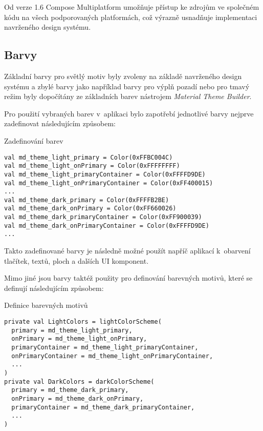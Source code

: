 Od verze 1.6 Compose Multiplatform umožňuje přístup ke zdrojům ve společném kódu na všech podporovaných platformách, což výrazně usnadňuje 
implementaci navrženého design systému. 


\subsection*{Barvy} \label{colorSection}
Základní barvy pro světlý motiv byly zvoleny na základě navrženého design systému
a zbylé barvy jako například barvy pro výplň pozadí nebo pro tmavý režim byly dopočítány ze základních barev nástrojem \textit{Material Theme Builder}.

Pro použití vybraných barev v~aplikaci bylo zapotřebí jednotlivé barvy nejprve zadefinovat následujícím způsobem:

\begin{listing}[H]
\caption{Zadefinování barev}\label{lst:Colors}
\begin{verbatim}
val md_theme_light_primary = Color(0xFFBC004C)
val md_theme_light_onPrimary = Color(0xFFFFFFFF)
val md_theme_light_primaryContainer = Color(0xFFFFD9DE)
val md_theme_light_onPrimaryContainer = Color(0xFF400015)
...
val md_theme_dark_primary = Color(0xFFFFB2BE)
val md_theme_dark_onPrimary = Color(0xFF660026)
val md_theme_dark_primaryContainer = Color(0xFF900039)
val md_theme_dark_onPrimaryContainer = Color(0xFFFFD9DE)
...
\end{verbatim}
\end{listing}

Takto zadefinované barvy je následně možné použít napříč aplikací k~obarvení tlačítek, textů, ploch a dalších UI komponent.

Mimo jiné jsou barvy taktéž použity pro definování barevných motivů, které se definují následujícím způsobem:
\begin{listing}[H]
\caption{Definice barevných motivů}\label{lst:ThemeDef}
\begin{verbatim}
private val LightColors = lightColorScheme(
  primary = md_theme_light_primary,
  onPrimary = md_theme_light_onPrimary,
  primaryContainer = md_theme_light_primaryContainer,
  onPrimaryContainer = md_theme_light_onPrimaryContainer,
  ...
)
private val DarkColors = darkColorScheme(
  primary = md_theme_dark_primary,
  onPrimary = md_theme_dark_onPrimary,
  primaryContainer = md_theme_dark_primaryContainer,
  ...
)
\end{verbatim}
\end{listing}

